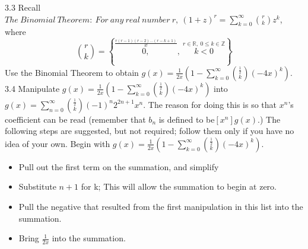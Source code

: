 \documentclass[10pt,a4paper]{report}
\begin{document}
	3.3 Recall $The\ Binomial\ Theorem:\ For\ any\ real\ number\ r,\ (1+z)^r = \sum_{k=0}^{\infty}\binom{r}{k}z^k$, where 
	\[\binom{r}{k} = \left \lbrace \overset{\frac{r(r-1)(r-2)...(r-k+1)}{k!}}{0,},\ \overset{r\in\mathbb{R},\ 0\leq k\in\mathbb{Z}}{k<0} \right \rbrace \]
	Use the Binomial Theorem to obtain $g(x) = \frac{1}{2x}(1-\sum_{k=0}^{\infty}\binom{\frac{1}{2}}{k}(-4x)^k)$.\\
	3.4 Manipulate $g(x) = \frac{1}{2x}(1-\sum_{k=0}^{\infty}\binom{\frac{1}{2}}{k}(-4x)^k)$ into $g(x) = \sum_{n=0}^{\infty}\binom{\frac{1}{2}}{k}(-1)^n2^{2n+1}x^n$.  The reason for doing this is so that $x^n$'s coefficient can be read (remember that $b_n$ is defined to be$ [x^n]g(x)$.)  The following steps are suggested, but not required; follow them only if you have no idea of your own.  Begin with $g(x) = \frac{1}{2x}(1-\sum_{k=0}^{\infty}\binom{\frac{1}{2}}{k}(-4x)^k)$.\\
	\begin{itemize}
		\item Pull out the first term on the summation,  and simplify
		\item Substitute $n+1$ for k;  This will allow the summation to begin at zero.
		\item Pull the negative that resulted from the first manipulation in this list into the summation. 
		\item Bring $\frac{1}{2x}$ into the summation.\\
	\end{itemize}
	
\end{document}
